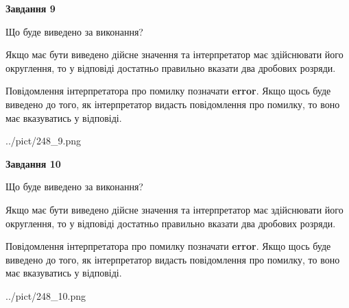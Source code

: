 \documentclass[12pt, ukrainian]{article}
\begin{document}
{\begin {Large}
{\begin {center}\textbf{Завдання 9}\end {center}}\par
Що буде виведено за виконання? \par

Якщо має бути виведено дійсне значення та інтерпретатор має здійснювати його округлення, 
то у відповіді достатньо правильно вказати два дробових розряди.

Повідомлення інтерпретатора про помилку позначати \textbf{error}.
Якщо щось буде виведено до того, як інтерпретатор видасть повідомлення про помилку, 
то воно має вказуватись у відповіді. \par

\begin{center}
	{../pict/248_9.png}
\end{center}
\newpage

{\begin {center}\textbf{Завдання 10}\end {center}}\par
Що буде виведено за виконання? \par

Якщо має бути виведено дійсне значення та інтерпретатор має здійснювати його округлення, 
то у відповіді достатньо правильно вказати два дробових розряди.

Повідомлення інтерпретатора про помилку позначати \textbf{error}.
Якщо щось буде виведено до того, як інтерпретатор видасть повідомлення про помилку, 
то воно має вказуватись у відповіді. \par

\begin{center}
	{../pict/248_10.png}
\end{center}
\newpage

\end {Large}}
\end{document}
